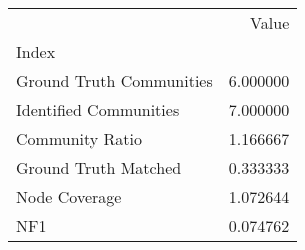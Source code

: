 \begin{tabular}{lr}
\toprule
{} &     Value \\
Index                    &           \\
\midrule
Ground Truth Communities &  6.000000 \\
Identified Communities   &  7.000000 \\
Community Ratio          &  1.166667 \\
Ground Truth Matched     &  0.333333 \\
Node Coverage            &  1.072644 \\
NF1                      &  0.074762 \\
\bottomrule
\end{tabular}
